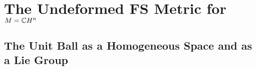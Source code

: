 \documentclass[parskip=half]{scrartcl}
\begin{document}

\section{The Undeformed FS Metric for \texorpdfstring{$M=\mathbb{C} H^n$}{Complex Hyperbolic Space}}

\subsection{The Unit Ball as a Homogeneous Space and as a Lie Group}
\end{document}
